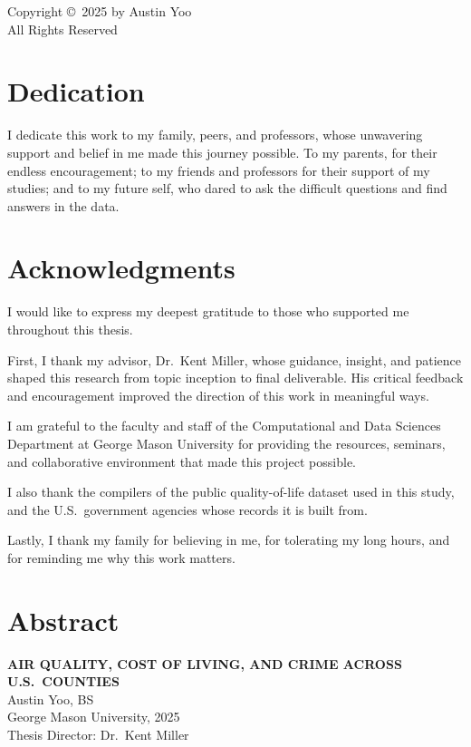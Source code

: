 \documentclass[12pt,letterpaper]{report}
\begin{document}
\thispagestyle{empty}
\vspace*{\fill}
\begin{center}
Copyright \copyright\ 2025 by Austin Yoo\\
All Rights Reserved
\end{center}
\vspace*{\fill}
\clearpage

\chapter*{Dedication}
I dedicate this work to my family, peers, and professors, whose unwavering support and
belief in me made this journey possible. To my parents, for their endless encouragement;
to my friends and professors for their support of my studies; and to my future self, who
dared to ask the difficult questions and find answers in the data.
\clearpage

\chapter*{Acknowledgments}
I would like to express my deepest gratitude to those who supported me throughout this
thesis.

First, I thank my advisor, Dr.\ Kent Miller, whose guidance, insight, and patience shaped
this research from topic inception to final deliverable. His critical feedback and
encouragement improved the direction of this work in meaningful ways.

I am grateful to the faculty and staff of the Computational and Data Sciences Department
at George Mason University for providing the resources, seminars, and collaborative
environment that made this project possible.

I also thank the compilers of the public quality-of-life dataset used in this study, and
the U.S.\ government agencies whose records it is built from.

Lastly, I thank my family for believing in me, for tolerating my long hours, and for
reminding me why this work matters.
\clearpage

\tableofcontents
\clearpage
\listoftables
\clearpage
\listoffigures
\clearpage

\chapter*{Abstract}
\begin{center}
{\bfseries AIR QUALITY, COST OF LIVING, AND CRIME ACROSS U.S.\ COUNTIES}\\[0.5em]
Austin Yoo, BS\\
George Mason University, 2025\\
Thesis Director: Dr.\ Kent Miller
\end{center}
\end{document}
